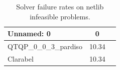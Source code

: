 \begin{table}
\caption{Solver failure rates on netlib infeasible problems.}
\label{t-netlib infeasible-failure}
\begin{tabular}{lcc}
\toprule
Unnamed: 0 & 0 \\
\midrule
QTQP_0_0_3_pardiso & 10.34 \\
Clarabel & 10.34 \\
\bottomrule
\end{tabular}
\end{table}

